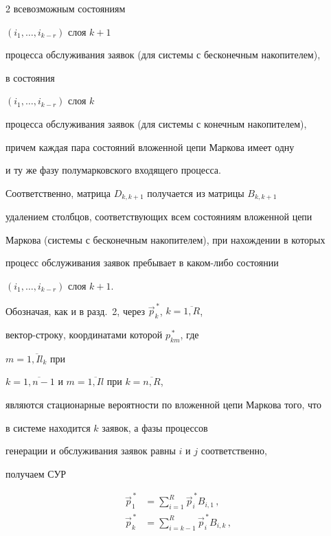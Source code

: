 \begin{multicols}{2}
всевозможным состояниям


$(i_1,\ldots,i_{k-r})$ слоя $k+1$


процесса обслуживания заявок (для системы с бесконечным накопителем),


в состояния


$(i_1,\ldots,i_{k-r})$ слоя $k$


процесса обслуживания заявок (для системы с конечным накопителем),


причем каждая пара состояний вложенной цепи  Маркова имеет одну


и ту же фазу полумарковского входящего процесса.


Соответственно, матрица $D_{k,k+1}$ получается из матрицы $B_{k,k+1}$


удалением столбцов, соответствующих всем состояниям вложенной цепи


Маркова (системы с бесконечным накопителем), при нахождении в которых


процесс обслуживания заявок пребывает в каком-либо состоянии


$(i_1,\ldots,i_{k-r})$ слоя $k+1$.





Обозначая, как и в разд.~2, через $\vec p_k^{\,*}$, $k=\overline{1,R}$,


вектор-строку, координатами которой $p_{km}^{\,*}$, где


$m=\overline{1,I l_k}$ при


$k=\overline{1,n-1}$ и $m=\overline{1,Il}$ при $k=\overline{n,R}$,


являются стационарные вероятности по вложенной цепи Маркова того, что


в системе находится $k$ заявок, а фазы процессов


генерации и обслуживания заявок равны $i$ и $j$ соответственно,


получаем СУР


\begin{align*}




\vec p_1^{\,*} &=


\sum\limits_{i=1}^{R}


\vec p_i^{\,*} B_{i,1}\,,\\


\vec p_k^{\,*} &=


\sum\limits_{i=k-1}^{R}


\vec p_i^{\,*} B_{i,k}\,,



\end{align*}
\end{multicols}
